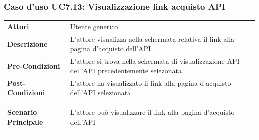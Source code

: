 \subsubsection{Caso d'uso UC7.13: Visualizzazione link acquisto API}
\label{UC7_13}

\begin{minipage}{\linewidth}
	\begin{tabular}{ l | p{11cm}}
		\hline
		\rowcolor{Gray}
		\multicolumn{2}{c}{UC7.13 - Visualizzazione link acquisto API} \\
		\hline
		\textbf{Attori} & Utente generico \\
		\textbf{Descrizione} & L'attore visualizza nella schermata relativa il link alla pagina d'acquisto dell'API \\
		\textbf{Pre-Condizioni} & L'attore si trova nella schermata di visualizzazione API dell'API precedentemente selezonata \\
		\textbf{Post-Condizioni} & L'attore ha visualizzato il link alla pagina d'acquisto dell'API selezionata \\
		\textbf{Scenario Principale} & 
		\begin{enumerate*}[label=(\arabic*.),itemjoin={\newline}]
			\item L'attore può visualizzare il link alla pagina d'acquisto dell'API
		\end{enumerate*}\\
	\end{tabular}
\end{minipage}